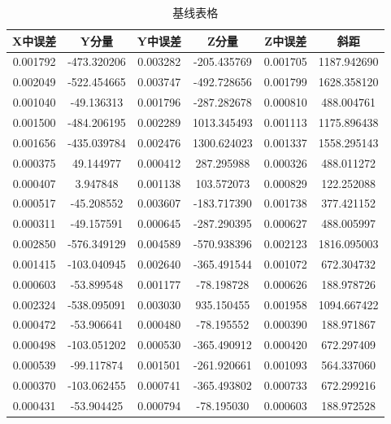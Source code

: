 \documentclass[a4paper,16pt,UTF8]{article}
\begin{document}
\begin{center}
    \begin{longtable}{|c|c|c|c|c|c|}
        \caption{基线表格} \\ \hline
        X中误差  & Y分量   & Y中误差  & Z分量   & Z中误差  & 斜距 \\ \hline
        0.001792  & -473.320206  & 0.003282  & -205.435769  & 0.001705  & 1187.942690  \\ \hline
        0.002049  & -522.454665  & 0.003747  & -492.728656  & 0.001799  & 1628.358120  \\\hline
        0.001040  & -49.136313  & 0.001796  & -287.282678  & 0.000810  & 488.004761  \\ \hline
        0.001500  & -484.206195  & 0.002289  & 1013.345493  & 0.001113  & 1175.896438  \\ \hline
        0.001656  & -435.039784  & 0.002476  & 1300.624023  & 0.001337  & 1558.295143  \\ \hline
        0.000375  & 49.144977  & 0.000412  & 287.295988  & 0.000326  & 488.011272  \\ \hline
        0.000407  & 3.947848  & 0.001138  & 103.572073  & 0.000829  & 122.252088  \\ \hline
        0.000517  & -45.208552  & 0.003607  & -183.717390  & 0.001738  & 377.421152  \\ \hline
        0.000311  & -49.157591  & 0.000645  & -287.290395  & 0.000627  & 488.005997  \\ \hline
        0.002850  & -576.349129  & 0.004589  & -570.938396  & 0.002123  & 1816.095003  \\ \hline
        0.001415  & -103.040945  & 0.002640  & -365.491544  & 0.001072  & 672.304732  \\ \hline
        0.000603  & -53.899548  & 0.001177  & -78.198728  & 0.000626  & 188.978726  \\ \hline
        0.002324  & -538.095091  & 0.003030  & 935.150455  & 0.001958  & 1094.667422  \\ \hline
        0.000472  & -53.906641  & 0.000480  & -78.195552  & 0.000390  & 188.971867  \\ \hline
        0.000498  & -103.051202  & 0.000530  & -365.490912  & 0.000420  & 672.297409  \\ \hline
        0.000539  & -99.117874  & 0.001501  & -261.920661  & 0.001093  & 564.337060  \\ \hline
        0.000370  & -103.062455  & 0.000741  & -365.493802  & 0.000733  & 672.299216  \\ \hline
        0.000431  & -53.904425  & 0.000794  & -78.195030  & 0.000603  & 188.972528  \\ \hline
    \end{longtable}
\end{center}
\end{document}
